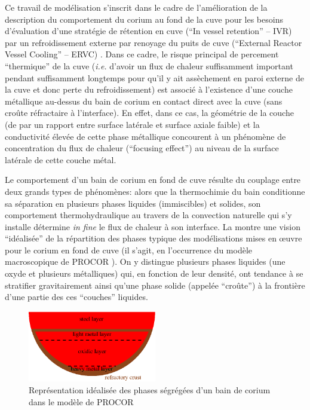 Ce travail de modélisation s'inscrit dans le cadre de l'amélioration de la description du comportement du corium au fond de la cuve pour les besoins d'évaluation d'une stratégie de rétention en cuve (``In vessel retention'' -- IVR) par un refroidissement externe par renoyage du puits de cuve (``External Reactor Vessel Cooling'' -- ERVC) \cite{Theofanous1997, Kymalainen1997}. Dans ce cadre, le risque principal de percement ``thermique'' de la cuve (\textit{i.e.} d'avoir un flux de chaleur suffisamment important pendant suffisamment longtemps pour qu'il y ait assèchement en paroi externe de la cuve et donc perte du refroidissement) est associé à l'existence d'une couche métallique au-dessus du bain de corium en contact direct avec la cuve (sans croûte réfractaire à l'interface). En effet, dans ce cas, la géométrie de la couche (de par un rapport entre surface latérale et surface axiale faible) et la conductivité élevée de cette phase métallique concourent à un phénomène de concentration du flux de chaleur (``focusing effect'') au niveau de la surface latérale de cette couche métal.

Le comportement d'un bain de corium en fond de cuve résulte du couplage entre deux grands types de phénomènes: alors que la thermochimie du bain conditionne sa séparation en plusieurs phases liquides (immiscibles) et solides, son comportement thermohydraulique au travers de la convection naturelle qui s'y installe détermine \textit{in fine} le flux de chaleur à son interface. La  montre une vision ``idéalisée'' de la répartition des phases typique des modélisations mises en \oe{}uvre pour le corium en fond de cuve (il s'agit, en l’occurrence du modèle macroscopique de PROCOR \cite{LeTellier2015}). On y distingue plusieurs phases liquides (une oxyde et plusieurs métalliques) qui, en fonction de leur densité, ont tendance à se stratifier gravitairement ainsi qu'une phase solide (appelée ``croûte'') à la frontière d'une partie des ces ``couches'' liquides. 

\begin{figure}[H]
 \centering
 \includegraphics[width=0.5\textwidth]{Figures/multilayer.eps}
 \caption{Représentation idéalisée des phases ségrégées d'un bain de corium dans le modèle de PROCOR}
 \label{fig:corium_stratif}
\end{figure}

